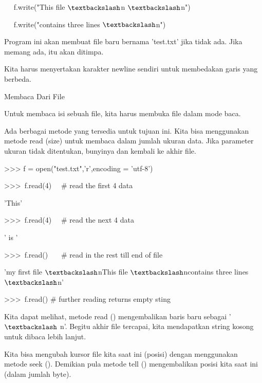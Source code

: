 ~~ f.write("This file $  \textbackslash  $n $  \textbackslash  $n") \par
~~ f.write("contains three lines $  \textbackslash  $n") \par
\vspace{12pt}
Program ini akan membuat file baru bernama 'test.txt' jika tidak ada. Jika memang ada, itu akan ditimpa. \par
\vspace{12pt}
Kita harus menyertakan karakter newline sendiri untuk membedakan garis yang berbeda. \par
Membaca Dari File \par
\vspace{12pt}
Untuk membaca isi sebuah file, kita harus membuka file dalam mode baca. \par
\vspace{12pt}
Ada berbagai metode yang tersedia untuk tujuan ini. Kita bisa menggunakan metode read (size) untuk membaca dalam jumlah ukuran data. Jika parameter ukuran tidak ditentukan, bunyinya dan kembali ke akhir file. \par
\vspace{12pt}
\vspace{12pt}
>>> f = open("test.txt",'r',encoding = 'utf-8') \par
>>>~f.read(4)~~   $  \#  $ read the first 4 data \par
'This' \par
\vspace{12pt}
>>>~f.read(4)~~   $  \#  $ read the next 4 data \par
' is ' \par
\vspace{12pt}
>>>~f.read()~~~   $  \#  $ read in the rest till end of file \par
'my first file $  \textbackslash  $nThis file $  \textbackslash  $ncontains three lines $  \textbackslash  $n' \par
\vspace{12pt}
>>>~f.read()   $  \#  $ further reading returns empty sting \par
\vspace{12pt}
\vspace{12pt}
Kita dapat melihat, metode read () mengembalikan baris baru sebagai ' $  \textbackslash  $ n'. Begitu akhir file tercapai, kita mendapatkan string kosong untuk dibaca lebih lanjut. \par
\vspace{12pt}
Kita bisa mengubah kursor file kita saat ini (posisi) dengan menggunakan metode seek (). Demikian pula metode tell () mengembalikan posisi kita saat ini (dalam jumlah byte). \par
